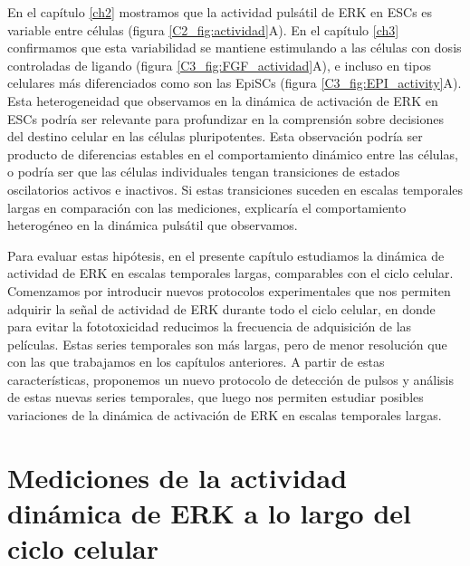 \documentclass[./main.tex]{subfiles}
\begin{document}

En el capítulo \ref{ch2} mostramos que la actividad pulsátil de ERK en ESCs es variable entre células (figura \ref{C2_fig:actividad}A).  En el capítulo \ref{ch3} confirmamos que esta variabilidad se mantiene estimulando a las células con dosis controladas de ligando (figura \ref{C3_fig:FGF_actividad}A), e incluso en tipos celulares más diferenciados como son las EpiSCs (figura \ref{C3_fig:EPI_activity}A). Esta heterogeneidad que observamos en la dinámica de activación de ERK en ESCs podría ser relevante para profundizar en la comprensión sobre decisiones del destino celular en las células pluripotentes. Esta observación podría ser producto de diferencias estables en el comportamiento dinámico entre las células, o podría ser que las células individuales tengan transiciones de estados oscilatorios activos e inactivos. Si estas transiciones suceden en escalas temporales largas en comparación con las mediciones, explicaría el comportamiento heterogéneo en la dinámica pulsátil que observamos.

Para evaluar estas hipótesis, en el presente capítulo estudiamos la dinámica de actividad de ERK en escalas temporales largas, comparables con el ciclo celular. Comenzamos por introducir nuevos protocolos experimentales que nos permiten adquirir la señal de actividad de ERK durante todo el ciclo celular, en donde para evitar la fototoxicidad reducimos la frecuencia de adquisición de las películas. Estas series temporales son más largas, pero de menor resolución que con las que trabajamos en los capítulos anteriores. A partir de estas características, proponemos un nuevo protocolo de detección de pulsos y análisis de estas nuevas series temporales, que luego nos permiten estudiar posibles variaciones de la dinámica de activación de ERK en escalas temporales largas. 



\section{Mediciones de la actividad dinámica de ERK a lo largo del ciclo celular}
\end{document}

